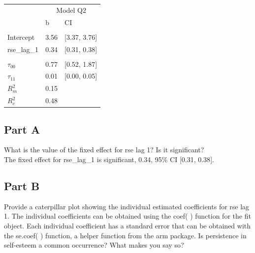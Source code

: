 \documentclass[]{article}
\begin{document}
\begin{table}[H]
\centering
\begin{tabular}{lll}
\toprule
\multicolumn{1}{c}{ } & \multicolumn{2}{c}{Model Q2} \\
\cmidrule(l{2pt}r{2pt}){2-3}
 & b & CI\\
\midrule
\addlinespace[0.3em]
\multicolumn{3}{l}{\textbf{Fixed}}\\
\hspace{1em}Intercept & 3.56 & [3.37, 3.76]\\
\hspace{1em}rse\_lag\_1 & 0.34 & [0.31, 0.38]\\
\addlinespace[0.3em]
\multicolumn{3}{l}{\textbf{Random}}\\
\hspace{1em}$\tau_{00}$ & 0.77 & [0.52, 1.87]\\
\hspace{1em}$\tau_{11}$ & 0.01 & [0.00, 0.05]\\
$R^2_m$ & 0.15 & \\
$R^2_c$ & 0.48 & \\
\bottomrule
\end{tabular}
\end{table}

\subsection{Part A}\label{part-a}

What is the value of the fixed effect for rse lag 1? Is it
significant?\\
The fixed effect for rse\_lag\_1 is significant, 0.34, 95\% CI {[}0.31,
0.38{]}.

\subsection{Part B}\label{part-b}

Provide a caterpillar plot showing the individual estimated coefficients
for rse lag 1. The individual coefficients can be obtained using the
coef( ) function for the fit object. Each individual coefficient has a
standard error that can be obtained with the se.coef( ) function, a
helper function from the arm package. Is persistence in self-esteem a
common occurrence? What makes you say so?
\end{document}
